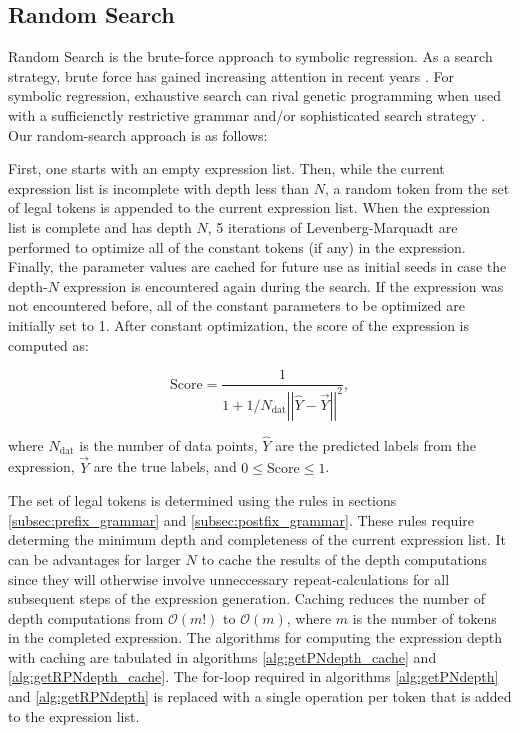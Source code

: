 \documentclass[12pt]{iopart}
\begin{document}
\subsection{Random Search}\label{subsec:RandomSearch}

Random Search is the brute-force approach to symbolic regression.  As a search strategy, brute force has gained increasing attention in recent years \cite{Heule2017TheSO}. For symbolic regression, exhaustive search can rival genetic programming when used with a sufficienctly restrictive grammar \cite{Kammerer2020} and/or sophisticated search strategy \cite{udrescu2020ai}.
Our random-search approach is as follows:
\par First, one starts with an empty expression list. Then, while the current expression list is incomplete with depth less than $N$, a random token from the set of legal tokens is appended to the current expression list. When the expression list is complete and has depth $N$, 5 iterations of Levenberg-Marquadt are performed to optimize all of the constant tokens (if any) in the expression. Finally, the parameter values are cached for future use as initial seeds in case the depth-$N$ expression is encountered again during the search. If the expression was not encountered before, all of the constant parameters to be optimized are initially set to 1. After constant optimization, the score of the expression is computed as:

\begin{equation}
\mathrm{Score} = \frac{1}{1+ 1/N_{\mathrm{dat}}\left|\left|\hat{Y}-\vec{Y}\right|\right|^2}, \label{eq:score_formula}
\end{equation}

where $N_{\mathrm{dat}}$ is the number of data points, $\hat{Y}$ are the predicted labels from the expression, $\vec{Y}$ are the true labels, and $0 \leq \mathrm{Score} \leq 1$. 

\par The set of legal tokens is determined using the rules in sections \ref{subsec:prefix_grammar} and \ref{subsec:postfix_grammar}. These rules require determing the minimum depth and completeness of the current expression list. It can be advantages for larger $N$ to cache the results of the depth computations since they will otherwise involve unneccessary repeat-calculations for all subsequent steps of the expression generation. Caching reduces the number of depth computations from $\mathcal{O}(m!)$ to $\mathcal{O}(m)$, where $m$ is the number of tokens in the completed expression. The algorithms for computing the expression depth with caching are tabulated in algorithms \ref{alg:getPNdepth_cache} and \ref{alg:getRPNdepth_cache}. The for-loop required in algorithms \ref{alg:getPNdepth} and \ref{alg:getRPNdepth} is replaced with a single operation per token that is added to the expression list. 
\end{document}
